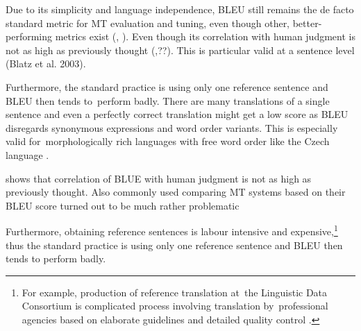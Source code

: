 



Due to its simplicity and language independence, BLEU still remains the de facto standard metric for MT evaluation and tuning, even though other, better-performing metrics exist (\cite{wmt13-metrics}, \cite{wmt14}).
Even though its correlation with human judgment is not as high as previously thought (\cite{callison2006re},\cite{koehn-monz:2006:WMT}??). 
This is particular valid at a sentence level (Blatz et al. 2003).

Furthermore, the standard practice is using only one reference sentence and BLEU  then tends to~perform badly. 
There are many translations of a single sentence and even a perfectly correct translation might get a low score as BLEU disregards synonymous expressions and word order variants.
This is especially valid for~morphologically rich languages with free word order like the Czech language \cite{bojar-tackling-sparse-data}.



\cite{callison2006re} shows that correlation of BLUE with human judgment is not as high as previously thought. 
Also commonly used comparing MT systems based on their BLEU score turned out to be much rather problematic \cite{tenMattPost}

Furthermore, obtaining reference sentences is labour intensive and expensive,\footnote{For example, production of reference translation at~the Linguistic Data Consortium is complicated process involving translation by~professional agencies based on elaborate guidelines and detailed quality control \cite{strassel}.} thus the standard practice is using only one reference sentence and BLEU then tends to perform badly. 

